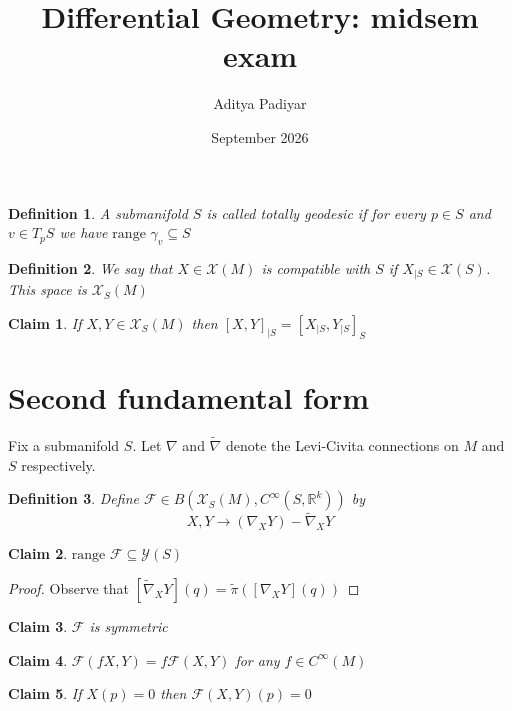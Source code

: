 \documentclass[a4paper,11pt]{article}
\title{Differential Geometry: midsem exam}
\author{Aditya Padiyar}
\date{September 2026}
\newtheorem{definition}{Definition}
\newtheorem{claim}{Claim}
\begin{document}
\maketitle

\begin{definition}
  A submanifold $S$ is called totally geodesic if for every $p \in S$ and $v \in T_pS$ we have $\text{range } \gamma_v \subseteq S$
\end{definition}

\begin{definition}
  We say that $X \in \mathcal{X}(M)$ is compatible with $S$ if $X_{|S} \in \mathcal{X}(S)$. This space is $\mathcal{X}_S(M)$
\end{definition}

\begin{claim}
  If $X,Y \in \mathcal{X}_S(M)$ then $[X,Y]_{|S}=[X_{|S},Y_{|S}]_S$
\end{claim}

\section{Second fundamental form}

Fix a submanifold $S$. Let $\nabla$ and $\tilde{\nabla}$ denote the Levi-Civita connections on $M$ and $S$ respectively.

\begin{definition}
  Define $\mathcal{F} \in B(\mathcal{X}_{S}(M),C^\infty(S,\mathbb{R}^k))$ by \[X,Y  \to (\nabla_XY)-\tilde{\nabla}_XY\]
\end{definition}

\begin{claim}
  $\text{range }\mathcal{F} \subseteq \mathcal{Y}(S)$
\end{claim}

\begin{proof}
  Observe that $[\tilde{\nabla}_XY](q)=\tilde{\pi}([\nabla_XY](q))$
\end{proof}

\begin{claim}
  $\mathcal{F}$ is symmetric
\end{claim}

\begin{claim}
  $\mathcal{F}(fX,Y)=f\mathcal{F}(X,Y)$ for any $f \in C^\infty(M)$
\end{claim}

\begin{claim}
  If $X(p)=0$ then $\mathcal{F}(X,Y)(p)=0$
\end{claim}
\end{document}

